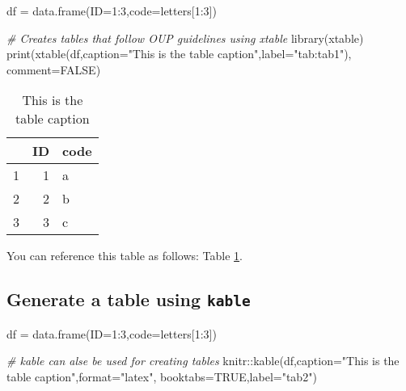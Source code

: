 \documentclass[12pt,halfline,a4paper,]{ouparticle}
\newenvironment{Shaded}{\begin{snugshade}}{\end{snugshade}}
\newcommand{\AttributeTok}[1]{\textcolor[rgb]{0.77,0.63,0.00}{#1}}
\newcommand{\CommentTok}[1]{\textcolor[rgb]{0.56,0.35,0.01}{\textit{#1}}}
\newcommand{\ConstantTok}[1]{\textcolor[rgb]{0.00,0.00,0.00}{#1}}
\newcommand{\DecValTok}[1]{\textcolor[rgb]{0.00,0.00,0.81}{#1}}
\newcommand{\FunctionTok}[1]{\textcolor[rgb]{0.00,0.00,0.00}{#1}}
\newcommand{\NormalTok}[1]{#1}
\newcommand{\OtherTok}[1]{\textcolor[rgb]{0.56,0.35,0.01}{#1}}
\newcommand{\SpecialCharTok}[1]{\textcolor[rgb]{0.00,0.00,0.00}{#1}}
\newcommand{\StringTok}[1]{\textcolor[rgb]{0.31,0.60,0.02}{#1}}
\begin{document}
\begin{Shaded}
\begin{Highlighting}[]
\NormalTok{df }\OtherTok{=} \FunctionTok{data.frame}\NormalTok{(}\AttributeTok{ID=}\DecValTok{1}\SpecialCharTok{:}\DecValTok{3}\NormalTok{,}\AttributeTok{code=}\NormalTok{letters[}\DecValTok{1}\SpecialCharTok{:}\DecValTok{3}\NormalTok{])}

\CommentTok{\# Creates tables that follow OUP guidelines using xtable}
\FunctionTok{library}\NormalTok{(xtable) }
\FunctionTok{print}\NormalTok{(}\FunctionTok{xtable}\NormalTok{(df,}\AttributeTok{caption=}\StringTok{"This is the table caption"}\NormalTok{,}\AttributeTok{label=}\StringTok{"tab:tab1"}\NormalTok{),}
      \AttributeTok{comment=}\ConstantTok{FALSE}\NormalTok{)}
\end{Highlighting}
\end{Shaded}

\begin{table}[ht]
\centering
\begin{tabular}{rrl}
  \hline
 & ID & code \\ 
  \hline
1 &   1 & a \\ 
  2 &   2 & b \\ 
  3 &   3 & c \\ 
   \hline
\end{tabular}
\caption{This is the table caption} 
\label{tab:tab1}
\end{table}

You can reference this table as follows: Table \ref{tab:tab1}.

\hypertarget{generate-a-table-using-kable}{%
\subsection{\texorpdfstring{Generate a table using \texttt{kable}}{Generate a table using kable}}\label{generate-a-table-using-kable}}

\begin{Shaded}
\begin{Highlighting}[]
\NormalTok{df }\OtherTok{=} \FunctionTok{data.frame}\NormalTok{(}\AttributeTok{ID=}\DecValTok{1}\SpecialCharTok{:}\DecValTok{3}\NormalTok{,}\AttributeTok{code=}\NormalTok{letters[}\DecValTok{1}\SpecialCharTok{:}\DecValTok{3}\NormalTok{])}

\CommentTok{\# kable can alse be used for creating tables}
\NormalTok{knitr}\SpecialCharTok{::}\FunctionTok{kable}\NormalTok{(df,}\AttributeTok{caption=}\StringTok{"This is the table caption"}\NormalTok{,}\AttributeTok{format=}\StringTok{"latex"}\NormalTok{,}
             \AttributeTok{booktabs=}\ConstantTok{TRUE}\NormalTok{,}\AttributeTok{label=}\StringTok{"tab2"}\NormalTok{)}
\end{Highlighting}
\end{Shaded}
\end{document}
